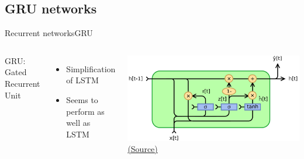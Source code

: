 \documentclass[10pt,compress]{beamer} %
\begin{document}
\subsection{GRU networks}
\begin{frame}{Recurrent networks}{GRU}
    \begin{columns}
            GRU: Gated Recurrent Unit
            \begin{itemize}
                \item Simplification of LSTM
                \item Seems to perform as well as LSTM
            \end{itemize}
            \centering \includegraphics[width=\textwidth]{figs/GRU.png}\\
	        \scriptsize\href{https://en.wikipedia.org/wiki/Gated_recurrent_unit}{(Source)}
    \end{columns}
\end{frame}
\end{document}
